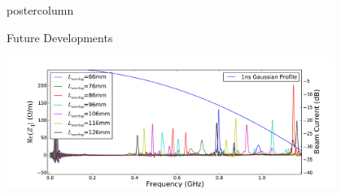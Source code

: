 \documentclass[final,hyperref={pdfpagelabels=false}]{beamer}
\begin{document}
\begin{frame}
\begin{columns}
\begin{column}{.49\textwidth}
\begin{beamercolorbox}[center,wd=\textwidth]{postercolumn}
\begin{minipage}[T]{.95\textwidth}
{\begin{block}{Future Developments}
\begin{itemize}
\begin{small}
\end{small}
\end{itemize}
\begin{center}\includegraphics[width=0.8\textwidth]{TUPRI030f6.pdf}
\end{center}
\end{block}



\vfill

          }
        \end{minipage}
      \end{beamercolorbox}
    \end{column}
  \end{columns}

\end{frame}
\end{document}
